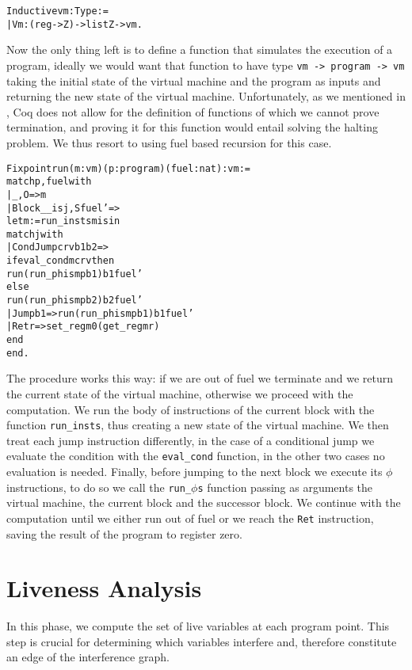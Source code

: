 \begin{alltt}
Inductive vm : Type :=
  | Vm : (reg -> Z) -> list Z -> vm.
\end{alltt}

Now the only thing left is to define a function that simulates the execution of a program, ideally we would want that function to have type \texttt{vm -> program -> vm} taking the initial state of the virtual machine and the program as inputs and returning the new state of the virtual machine.
Unfortunately, as we mentioned in , Coq does not allow for the definition of functions of which we cannot prove termination, and proving it for this function would entail solving the halting problem. We thus resort to using fuel based recursion for this case.

\begin{alltt}
Fixpoint run (m : vm) (p : program) (fuel : nat) : vm :=
  match p, fuel with
  | _, O => m
  | Block _ _ is j, S fuel' =>
    let m := run_insts m is in
    match j with
    | CondJump c r v b1 b2 =>
      if eval_cond m c r v then
        run (run_phis m p b1) b1 fuel'
      else
        run (run_phis m p b2) b2 fuel'
    | Jump b1 => run (run_phis m p b1) b1 fuel'
    | Ret r => set_reg m 0 (get_reg m r)
    end
  end.
\end{alltt}

The procedure works this way: if we are out of fuel we terminate and we return the current state of the virtual machine, otherwise we proceed with the computation.
We run the body of instructions of the current block with the function \texttt{run\_insts}, thus creating a new state of the virtual machine. We then treat each jump instruction differently, in the case of a conditional jump we evaluate the condition with the \texttt{eval\_cond} function, in the other two cases no evaluation is needed. Finally, before jumping to the next block we execute its $\phi$ instructions, to do so we call the \texttt{run\_$\phi$s} function  passing as arguments the virtual machine, the current block and the successor block.
We continue with the computation until we either run out of fuel or we reach the \texttt{Ret} instruction, saving the result of the program to register zero.

\section{Liveness Analysis}
\label{sec:liveness}

In this phase, we compute the set of live variables at each program point. This step is crucial for determining which variables interfere and, therefore constitute an edge of the interference graph.

